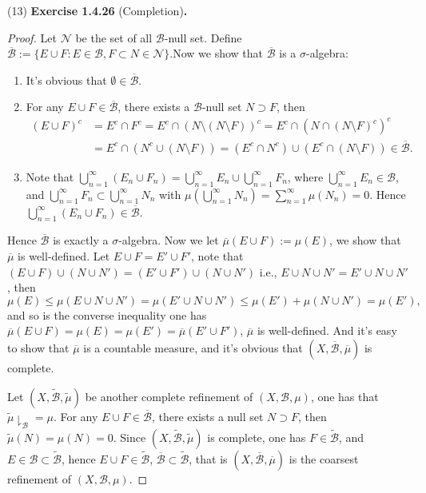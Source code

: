 \documentclass[a4paper]{article}
\begin{document}
(13) {\bfseries Exercise 1.4.26} (Completion){\bfseries .}\begin{proof}
Let $\mathcal{N}$ be the set of all $\mathcal{B}$-null set. Define $
\mathcal{\overline{B}} := \{E \cup F : E \in \mathcal{B}, F \subset N \in \mathcal{N}\}.
$Now we show that $\mathcal{\overline{B}}$ is a $\sigma$-algebra: \begin{enumerate}[label = (\roman*)]
    \item It's obvious that $\emptyset \in \mathcal{\overline{B}}$.
    \item For any $E \cup F \in \mathcal{\overline{B}}$, there exists a $\mathcal{B}$-null set $N \supset F$, then \begin{align*}
    (E \cup F)^c &= E^c \cap F^c = E^c \cap (N \setminus (N \setminus F))^c = E^c \cap (N \cap (N \setminus F)^c)^c \\
    &= E^c \cap (N^c \cup (N \setminus F)) = (E^c \cap N^c) \cup (E^c \cap (N \setminus F)) \in \mathcal{\overline{B}}.
    \end{align*}
    \item Note that $\bigcup_{n = 1}^\infty (E_n \cup F_n) = \bigcup_{n = 1}^\infty E_n \cup \bigcup_{n = 1}^\infty F_n$,
    where $\bigcup_{n = 1}^\infty E_n \in \mathcal{B}$, and $\bigcup_{n = 1}^\infty F_n \subset \bigcup_{n = 1}^\infty N_n$
    with $\mu(\bigcup_{n = 1}^\infty N_n) = \sum_{n = 1}^\infty \mu(N_n) = 0$. Hence $\bigcup_{n = 1}^\infty (E_n \cup F_n) 
    \in \mathcal{\overline{B}}$.
\end{enumerate}
Hence $\mathcal{\overline{B}}$ is exactly a $\sigma$-algebra. Now we let $\overline{\mu}(E \cup F) := \mu(E)$,
we show that $\overline{\mu}$ is well-defined. Let $E \cup F = E' \cup F'$, note that $(E \cup F) \cup (N \cup N')
= (E' \cup F') \cup (N \cup N')$ i.e., $E \cup N \cup N' = E' \cup N \cup N'$, then $$
\mu(E) \leq \mu(E \cup N \cup N') = \mu(E' \cup N \cup N') \leq \mu(E') + \mu(N \cup N') = \mu(E'),
$$and so is the converse inequality one has $\overline{\mu}(E \cup F) = \mu(E) = \mu(E') = \overline{\mu}(E' \cup F')$, 
$\overline{\mu}$ is well-defined. And it's easy to show that $\overline{\mu}$ is a countable measure, and it's
obvious that $(X, \mathcal{\overline{B}},\overline{\mu})$ is complete.

Let $(X, \mathcal{\tilde{B}}, \tilde{\mu})$ be another complete refinement of $(X, \mathcal{B}, \mu)$, one has that
$\tilde{\mu}\downharpoonright_\mathcal{B} = \mu$. For any $E \cup F \in \mathcal{\overline{B}}$, there exists a null
set $N \supset F$, then $\tilde{\mu}(N) = \mu(N) = 0$. Since $(X, \mathcal{\tilde{B}}, \tilde{\mu})$ is complete, 
one has $F \in \tilde{\mathcal{B}}$, and $E \in \mathcal{B} \subset \mathcal{\tilde{B}}$, hence $E \cup F \in \mathcal{\tilde{B}}$,
$\overline{\mathcal{B}} \subset \mathcal{\tilde{B}}$, that is $(X, \mathcal{\overline{B}}, \overline{\mu})$ is the 
coarsest refinement of $(X, \mathcal{{B}}, {\mu})$. 


\end{proof}
\end{document}
